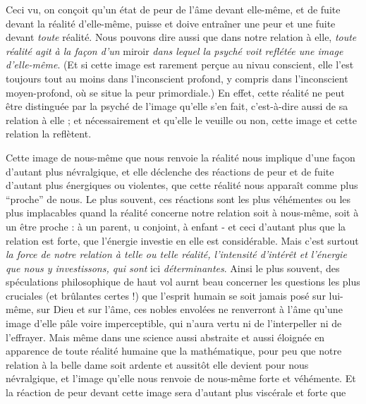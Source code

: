 Ceci vu, on conçoit qu'un état de peur de l'âme devant elle-même, et de fuite devant la réalité d'elle-même, puisse et doive entraîner une peur et une fuite devant \textit{toute} réalité. Nous pouvons dire aussi que dans notre relation à elle, \textit{toute réalité agit à la façon d'un} miroir \textit{dans lequel la psyché voit reflétée une image d'elle-même}. (Et si cette image est rarement perçue au \margin{\handwritten{$\bullet$}}nivau conscient, elle l'est toujours tout au moins dans l'inconscient profond, y compris dans l'inconscient moyen-profond, où se situe la peur primordiale.) En effet, cette réalité ne peut être distinguée par la psyché de l'image qu'elle s'en fait, c'est-à-dire aussi de sa relation à elle ; et nécessairement et qu'elle le veuille ou non, cette image et cette relation la reflètent.

Cette image de nous-même que nous renvoie la réalité nous implique d'une façon d'autant plus névralgique, et elle déclenche des réactions de peur et de fuite d'autant plus énergiques ou violentes, que cette réalité nous apparaît comme plus ``proche'' de nous. Le plus souvent, ces réactions sont les plus véhémentes ou les plus implacables quand la réalité concerne notre relation soit à nous-même, soit à un être proche : à un parent, \margin{\handwritten{$\bullet$}}u conjoint, à \margin{\handwritten{$\bullet$}} enfant - et ceci d'autant plus que la relation est forte, que l'énergie investie en elle est considérable. Mais c'est surtout \textit{la force de notre relation à telle ou telle réalité, l'intensité d'intérêt et l'énergie que nous y investissons, qui sont} ici \textit{déterminantes}. Ainsi le plus souvent, des spéculations philosophique de haut vol\margin{\handwritten{$\bullet\ \bullet$}}\deleted{\unsure{,}}\handwritten{/} aurnt beau concerner les questions les plus cruciales (et brûlantes certes !) que l'esprit humain se soit jamais posé sur lui-même, sur Dieu et sur l'âme, ces nobles envolées ne renverront à l'âme qu'une image d'elle pâle voire imperceptible, qui n'aura vertu ni de l'interpeller ni de l'effrayer. Mais même dans une science aussi abstraite et aussi éloignée en apparence de toute réalité humaine que la mathématique, pour peu que notre relation à la belle dame soit ardente et aussitôt elle devient pour nous névralgique, et l'image qu'elle nous renvoie de nous-même forte et véhémente. Et la réaction de peur devant cette image sera d'autant plus viscérale et forte que

